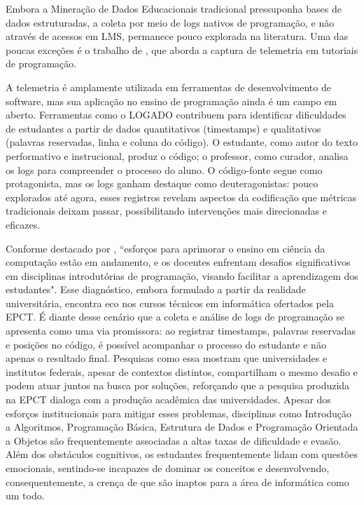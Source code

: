 Embora a Mineração de Dados Educacionais tradicional pressuponha bases de dados estruturadas, a coleta por meio de logs nativos de programação, e não através de acessos em LMS, permanece pouco explorada na literatura. Uma das poucas exceções é o trabalho de \cite{kennedy2015towards}, que aborda a captura de telemetria em tutoriais de programação.

A telemetria é amplamente utilizada em ferramentas de desenvolvimento de software, mas sua aplicação no ensino de programação ainda é um campo em aberto. Ferramentas como o LOGADO contribuem para identificar dificuldades de estudantes a partir de dados quantitativos (timestamps) e qualitativos (palavras reservadas, linha e coluna do código). O estudante, como autor do texto performativo e instrucional, produz o código; o professor, como curador, analisa os logs para compreender o processo do aluno. O código-fonte segue como protagonista, mas os logs ganham destaque como deuteragonistas: pouco explorados até agora, esses registros revelam aspectos da codificação que métricas tradicionais deixam passar, possibilitando intervenções mais direcionadas e eficazes.

Conforme destacado por \cite{qian2017students}, ``esforços para aprimorar o ensino em ciência da computação estão em andamento, e os docentes enfrentam desafios significativos em disciplinas introdutórias de programação, visando facilitar a aprendizagem dos estudantes". Esse diagnóstico, embora formulado a partir da realidade universitária, encontra eco nos cursos técnicos em informática ofertados pela EPCT. É diante desse cenário que a coleta e análise de logs de programação se apresenta como uma via promissora: ao registrar timestamps, palavras reservadas e posições no código, é possível acompanhar o processo do estudante e não apenas o resultado final. Pesquisas como essa mostram que universidades e institutos federais, apesar de contextos distintos, compartilham o mesmo desafio e podem atuar juntos na busca por soluções, reforçando que a pesquisa produzida na EPCT dialoga com a produção acadêmica das universidades. Apesar dos esforços institucionais para mitigar esses problemas, disciplinas como Introdução a Algoritmos, Programação Básica, Estrutura de Dados e Programação Orientada a Objetos são frequentemente associadas a altas taxas de dificuldade e evasão. Além dos obstáculos cognitivos, os estudantes frequentemente lidam com questões emocionais, sentindo-se incapazes de dominar os conceitos e desenvolvendo, consequentemente, a crença de que são inaptos para a área de informática como um todo.

